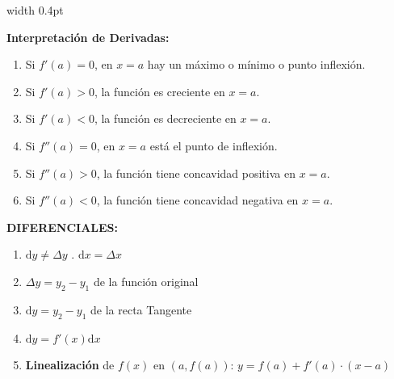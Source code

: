 \documentclass[10pt, letterpaper, landscape]{article}
\newcommand{\dd}{\mathrm{d}}
\begin{document}
\hfill
\vrule width 0.4pt
\hfill
\begin{minipage}[t]{8.3cm}
    \begin{tcolorbox}[colback=white, colframe=black, boxrule=0.5pt, arc=0pt, auto outer arc, left=2pt, right=2pt, top=2pt, bottom=2pt, boxsep=1pt, before=\vspace{4pt}, after=\vspace{4pt}]
        \textbf{\normalsize Interpretación de Derivadas:}
        \begin{enumerate}[label=\arabic*., itemsep=1pt, leftmargin=12pt]
            \item Si $f'(a) = 0$, en $x=a$ hay un máximo o mínimo o punto inflexión.
            \item Si $f'(a) > 0$, la función es creciente en $x=a$.
            \item Si $f'(a) < 0$, la función es decreciente en $x=a$.
            \item Si $f''(a) = 0$, en $x=a$ está el punto de inflexión.
            \item Si $f''(a) > 0$, la función tiene concavidad positiva en $x=a$.
            \item Si $f''(a) < 0$, la función tiene concavidad negativa en $x=a$.
        \end{enumerate}
    \end{tcolorbox}

    \vspace{0.2cm}
    \begin{tcolorbox}[colback=white, colframe=black, boxrule=0.5pt, arc=0pt, auto outer arc, left=2pt, right=2pt, top=2pt, bottom=2pt, boxsep=1pt, before=\vspace{4pt}, after=\vspace{4pt}]
        \textbf{\normalsize DIFERENCIALES:}
        \begin{enumerate}[label=\arabic*., itemsep=1pt, leftmargin=12pt]
            \item $\dd y \neq \Delta y$ . $\dd x = \Delta x$
            \item $\Delta y = y_2 - y_1$ de la función original
            \item $\dd y = y_2 - y_1$ de la recta Tangente
            \item $\dd y = f'(x) \dd x$
            \item \textbf{Linealización} de $f(x)$ en $(a, f(a))$: $y = f(a) + f'(a) \cdot (x - a)$
        \end{enumerate}
    \end{tcolorbox}
\end{minipage}
\end{document}
